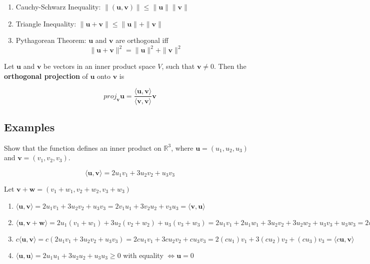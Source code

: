 \documentclass{report}
\begin{document}
\begin{tcolorbox}[title = Generalized Theorems from the Dot Product]
	\begin{enumerate}
		\item Cauchy-Schwarz Inequality: $\| (\bm{u}, \bm{v}) \| \le \| \bm{u} \| \| \bm{v} \|$
		\item Triangle Inequality: $\| \bm{u} + \bm{v} \| \le \| \bm{u} \| + \| \bm{v} \|$
		\item Pythagorean Theorem: $\bm{u}$ and $\bm{v}$ are orthogonal iff
		$$
		\| \bm{u} + \bm{v} \| ^2 = \| \bm{u} \| ^2 + \| \bm{v} \| ^2 
		$$
	\end{enumerate}
\end{tcolorbox}

\begin{tcolorbox}[title = Definition of Orthogonal Projection]
	Let $\bm{u}$ and $\bm{v}$ be vectors in an inner product space $V$, such that $\bm{v} \ne 0$. Then the \textbf{orthogonal projection} of $\bm{u}$ onto $\bm{v}$ is 
	
	$$
	proj_{\bm{v}} \bm{u} = \frac{\langle \bm{u}, \bm{v} \rangle}{\langle \bm{v}, \bm{v} \rangle} \bm{v}
	$$
\end{tcolorbox}

\subsection{Examples}

\begin{tcolorbox}[colframe = lightred]
	Show that the function defines an inner product on $\mathbb{R}^3$, where $\bm{u} = (u_1, u_2, u_3)$ and $\bm{v} = (v_1,v_2,v_3)$.
	
	$$
	\langle \bm{u}, \bm{v} \rangle = 2u_1 v_1 + 3u_2 v_2 + u_3 v_3
	$$
\end{tcolorbox}

Let $\bm{v} + \bm{w} = (v_1 + w_1, v_2 + w_2, v_3 + w_3)$

\begin{enumerate}
	\item $\langle \bm{u}, \bm{v} \rangle = 2u_1 v_1 + 3u_2 v_2 + u_3 v_3 = 2v_1 u_1 + 3v_2 u_2 + v_3 u_3 = \langle \bm{v}, \bm{u} \rangle$
	\item $\langle \bm{u}, \bm{v} + \bm{w} \rangle = 2 u_1 (v_1 + w_1) + 3u_2 (v_2 + w_2 ) + u_3 (v_3 + w_3) = 2u_1 v_1 + 2u_1 w_1 + 3u_2 v_2 + 3u_2 w_2 + u_3 v_3 + u_3 w_3  = 2u_1 v_1 + 3u_2 v_2 + u_3 v_3 + 2u_1 w_1 + 3u_2 w_2 + u_3 w_3 = \langle \bm{u} + \bm{v} \rangle + \langle \bm{u}, \bm{w} \rangle$
	\item $c \langle \bm{u}, \bm{v} \rangle = c (2u_1v_1 + 3u_2 v_2 + u_3 v_3) = 2cu_1 v_1 + 3cu_2 v_2 + cu_3 v_3 = 2(cu_1) v_1 + 3 (cu_2) v_2 + (cu_3) v_3 = \langle c\bm{u}, \bm{v} \rangle$
	\item $\langle \bm{u}, \bm{u} \rangle = 2u_1 u_1 + 3u_2 u_2 + u_3 u_3 \ge 0 $ with equality $\iff \bm{u} = 0$
\end{enumerate}
\end{document}
